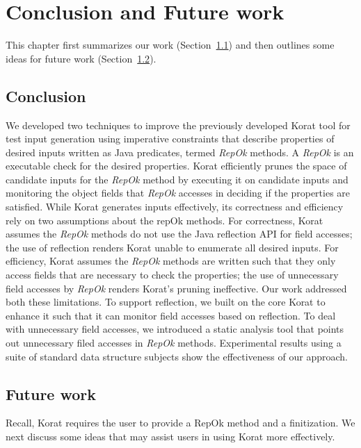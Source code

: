 \chapter{Conclusion and Future work}
\label{ch:conclusion-and-future-work}

This chapter first summarizes our work (Section~\ref{sec:conclusion}) and
then outlines some ideas for future work (Section~\ref{sec:future-work}).

\section{Conclusion}
\label{sec:conclusion}
We developed two techniques to improve the previously developed Korat
tool for test input generation using imperative constraints that
describe properties of desired inputs written as Java predicates,
termed \emph{RepOk} methods.  A \emph{RepOk} is an executable check
for the desired properties.  Korat efficiently prunes the space of
candidate inputs for the \emph{RepOk} method by executing it on
candidate inputs and monitoring the object fields that \emph{RepOk}
accesses in deciding if the properties are satisfied.  While Korat
generates inputs effectively, its correctness and efficiency rely on
two assumptions about the repOk methods.  For correctness, Korat
assumes the \emph{RepOk} methods do not use the Java reflection API
for field accesses; the use of reflection renders Korat unable to
enumerate all desired inputs.  For efficiency, Korat assumes the
\emph{RepOk} methods are written such that they only access fields
that are necessary to check the properties; the use of unnecessary
field accesses by \emph{RepOk} renders Korat's pruning ineffective.
Our work addressed both these limitations.  To support reflection, we
built on the core Korat to enhance it such that it can monitor field
accesses based on reflection.  To deal with unnecessary field
accesses, we introduced a static analysis tool that points out
unnecessary filed accesses in \emph{RepOk} methods. Experimental
results using a suite of standard data structure subjects show the
effectiveness of our approach.


\section{Future work}
\label{sec:future-work}
Recall, Korat requires the user to provide a RepOk method and a
finitization.  We next discuss some ideas that may assist users in
using Korat more effectively.


